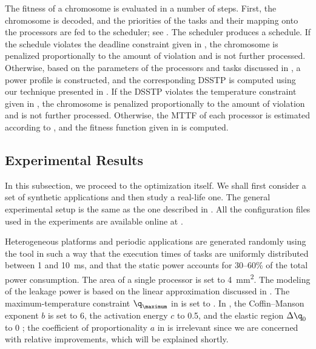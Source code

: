 The fitness of a chromosome is evaluated in a number of steps. First, the
chromosome is decoded, and the priorities of the tasks and their mapping onto
the processors are fed to the scheduler; see . The scheduler
produces a schedule. If the schedule violates the deadline constraint given in
, the chromosome is penalized proportionally
to the amount of violation and is not further processed. Otherwise, based on the
parameters of the processors and tasks discussed in , a power
profile \mp is constructed, and the corresponding \ac{DSSTP} \mq is computed
using our technique presented in . If the
\ac{DSSTP} violates the temperature constraint given in
, the chromosome is penalized proportionally
to the amount of violation and is not further processed. Otherwise, the
\ac{MTTF} of each processor is estimated according to
, and the fitness function given in
 is computed.

\subsection{Experimental Results}

In this subsection, we proceed to the optimization itself. We shall first
consider a set of synthetic applications and then study a real-life one. The
general experimental setup is the same as the one described in
. All the configuration files used in the
experiments are available online at \cite{eslab2011}.

Heterogeneous platforms and periodic applications are generated randomly using
the  tool \cite{dick1998} in such a way that the execution times of
tasks are uniformly distributed between 1 and 10~ms, and that the static power
accounts for 30--60\% of the total power consumption. The area of a single
processor is set to 4~mm\textsuperscript{2}. The modeling of the leakage power
is based on the linear approximation discussed in
. The maximum-temperature constraint
$\q_\maximum$ in  is set to . In
, the Coffin--Manson exponent $b$ is set to 6, the
activation energy $c$ to 0.5, and the elastic region $\Delta \q_0$ to 0
\cite{jedec2010}; the coefficient of proportionality $a$ in
 is irrelevant since we are concerned with
relative improvements, which will be explained shortly.


